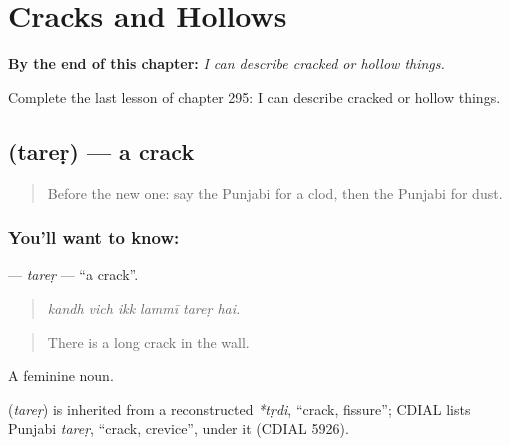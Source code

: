 
\chapter{Cracks and Hollows}
\label{ch:pa-a2-cracks-and-hollows}

\begin{chapteropening}
\textbf{By the end of this chapter:} \emph{I can describe cracked or hollow things.}

Complete the last lesson of chapter 295: I can describe cracked or hollow things.
\end{chapteropening}

\section[\texorpdfstring{\pa{ਤਰੇੜ} (tareṛ)}{ਤਰੇੜ (tareṛ)}]{ (tareṛ) — a crack}

\label{lesson:PA-C295-tarer}



\begin{quote}
Before the new one: say the Punjabi for a clod, then the Punjabi for dust.
\end{quote}

\subsection*{You'll want to know: }
\textbf{} — \emph{tareṛ} — \textquotedblleft{}a crack\textquotedblright{}.

\begin{quote}
     
\end{quote}

\begin{quote}
\emph{kandh vich ikk lammī tareṛ hai.}
\end{quote}

\begin{quote}
There is a long crack in the wall.
\end{quote}

A feminine noun.

\begin{cousinweb}
\textbf{} (\emph{tareṛ}) is inherited from a reconstructed \emph{*tṛdi}, \textquotedblleft{}crack, fissure\textquotedblright{}; CDIAL lists Punjabi \emph{tareṛ}, \textquotedblleft{}crack, crevice\textquotedblright{}, under it (CDIAL 5926).
\end{cousinweb}

